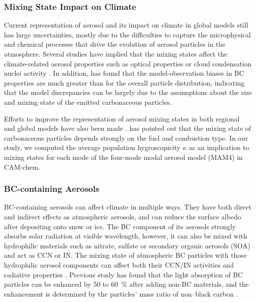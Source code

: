 \documentclass[12pt, fullpage]{uiucthesis2009_2}
\begin{document}
	\subsubsection{Mixing State Impact on Climate}
	Current representation of aerosol and its impact on climate in global models still has large uncertainties, mostly due to the difficulties to capture the microphysical and chemical processes that drive the evolution of aerosol particles in the atmosphere. Several studies have implied that the mixing states affect the climate-related aerosol properties such as optical properties or cloud condensation nuclei activity \citep[e.g.][]{jacobson2001strong,zaveri2010contributions,koch2009evaluation}. In addition, \citet{Reddington2013} has found that the model-observation biases in BC properties are much greater than for the overall particle distribution, indicating that the model discrepancies can be largely due to the assumptions about the size and mixing state of the emitted carbonaceous particles. 
	
	Efforts to improve the representation of aerosol mixing states in both regional and global models have also been made  \citep[e.g.][]{jacobson2001strong,Riemer2013}. \citet{Riemer2013} has pointed out that the mixing state of carbonaceous particles depends strongly on the fuel and combustion type. In our study, we computed the average population hygroscopicity $\kappa$ as an implication to mixing states for each mode of the four-mode modal aerosol model (MAM4) in CAM-chem.
	
	\subsubsection{BC-containing Aerosols}
	BC-containing aerosols can affect climate in multiple ways. They have both direct and indirect effects as atmospheric aerosols, and can reduce the surface albedo after depositing onto snow or ice. The BC component of its aerosols strongly absorbs solar radiation at visible wavelength, however, it can also be mixed with hydrophilic materials such as nitrate, sulfate or secondary organic aerosols (SOA) and act as CCN or IN. The mixing state of atmospheric BC particles with those hydrophilic aerosol components can affect both their CCN/IN activities and radiative properties \citep[e.g.][]{cheng2006}. Previous study has found that the light absorption of BC particles can be enhanced by 50 to 60~$\%$ after adding non-BC materials, and the enhancement is determined by the particles' mass ratio of non--black carbon \citep{liu2017black}. 
	
\end{document}

